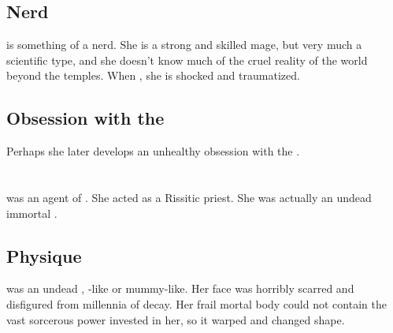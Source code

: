 \subsection{Nerd}
\Shilred{} is something of a nerd. 
She is a strong and skilled mage, but very much a scientific type, and she doesn't know much of the cruel reality of the world beyond the temples. 
When , she is shocked and traumatized. 









\subsection{Obsession with the \xss}
Perhaps she later develops an unhealthy obsession with the \xss.
















\section{\TessHanith}
\TessHanith was an agent of \Secherdamon. 
She acted as a Rissitic priest.
She was actually an undead immortal . 









\subsection{Physique}
\TessHanith was an undead , \Lich-like or mummy-like. 
Her face was horribly scarred and disfigured from millennia of decay.
Her frail mortal body could not contain the vast sorcerous power invested in her, so it warped and changed shape.

